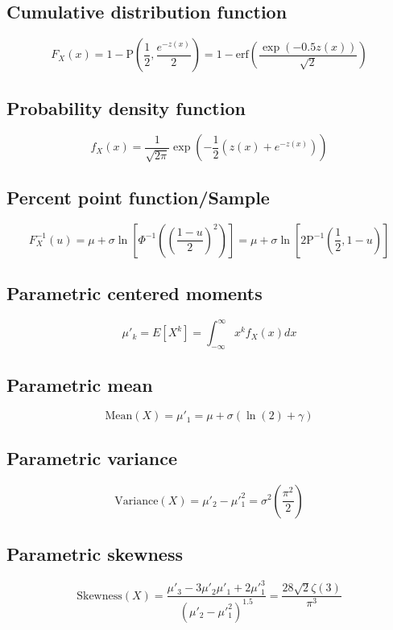 \documentclass{article}
\begin{document}
\subsection{Cumulative distribution function}
\begin{equation*} F_{X}\left(x\right)=1-\text{P}\left(\frac{1}{2},\frac{e^{-z(x)}}{2}\right)=1-\mathrm{erf}\left(\frac{\exp\left(-0.5z(x)\right)}{\sqrt{2}}\right) \end{equation*}
\subsection{Probability density function}
\begin{equation*} f_{X}\left(x\right)=\frac{1}{\sqrt{2\pi}}\exp\left(-\frac{1}{2}\left(z(x)+e^{-z(x)}\right)\right) \end{equation*}
\subsection{Percent point function/Sample}
\begin{equation*} F^{-1}_{X}\left(u\right)=\mu+\sigma\ln\left[\Phi^{-1}\left(\left(\frac{1-u}{2}\right)^{2}\right)\right]=\mu+\sigma\ln\left[2\text{P}^{-1}\left(\frac{1}{2},1-u\right)\right] \end{equation*}
\subsection{Parametric centered moments}
\begin{equation*} \mu'_{k}=E[X^k]=\int_{-\infty }^{\infty }x^{k}f_{X}\left(x\right)dx \end{equation*}
\subsection{Parametric mean}
\begin{equation*} \mathrm{Mean}(X)=\mu'_{1}=\mu+\sigma(\ln(2)+\gamma) \end{equation*}
\subsection{Parametric variance}
\begin{equation*} \mathrm{Variance}(X)=\mu'_{2}-\mu'^{2}_{1}=\sigma^{2}\left(\frac{\pi^{2}}{2}\right) \end{equation*}
\subsection{Parametric skewness}
\begin{equation*} \mathrm{Skewness}(X)=\frac{\mu'_{3}-3\mu'_{2}\mu'_{1}+2\mu'^{3}_{1}}{(\mu'_{2}-\mu'^{2}_{1})^{1.5}}=\frac{28\sqrt{2}\zeta(3)}{\pi^{3}} \end{equation*}
\end{document}

